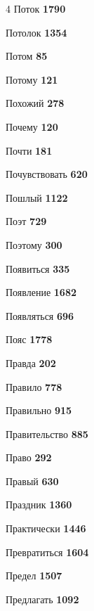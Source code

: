\begin{multicols}{4}
\noindent Поток \dotfill \textbf{\color{secondary} 1790}\par
\noindent Потолок \dotfill \textbf{\color{secondary} 1354}\par
\noindent Потом \dotfill \textbf{\color{secondary} 85}\par
\noindent Потому \dotfill \textbf{\color{secondary} 121}\par
\noindent Похожий \dotfill \textbf{\color{secondary} 278}\par
\noindent Почему \dotfill \textbf{\color{secondary} 120}\par
\noindent Почти \dotfill \textbf{\color{secondary} 181}\par
\noindent Почувствовать \dotfill \textbf{\color{secondary} 620}\par
\noindent Пошлый \dotfill \textbf{\color{secondary} 1122}\par
\noindent Поэт \dotfill \textbf{\color{secondary} 729}\par
\noindent Поэтому \dotfill \textbf{\color{secondary} 300}\par
\noindent Появиться \dotfill \textbf{\color{secondary} 335}\par
\noindent Появление \dotfill \textbf{\color{secondary} 1682}\par
\noindent Появляться \dotfill \textbf{\color{secondary} 696}\par
\noindent Пояс \dotfill \textbf{\color{secondary} 1778}\par
\noindent Правда \dotfill \textbf{\color{secondary} 202}\par
\noindent Правило \dotfill \textbf{\color{secondary} 778}\par
\noindent Правильно \dotfill \textbf{\color{secondary} 915}\par
\noindent Правительство \dotfill \textbf{\color{secondary} 885}\par
\noindent Право \dotfill \textbf{\color{secondary} 292}\par
\noindent Правый \dotfill \textbf{\color{secondary} 630}\par
\noindent Праздник \dotfill \textbf{\color{secondary} 1360}\par
\noindent Практически \dotfill \textbf{\color{secondary} 1446}\par
\noindent Превратиться \dotfill \textbf{\color{secondary} 1604}\par
\noindent Предел \dotfill \textbf{\color{secondary} 1507}\par
\noindent Предлагать \dotfill \textbf{\color{secondary} 1092}\par

\end{multicols}
